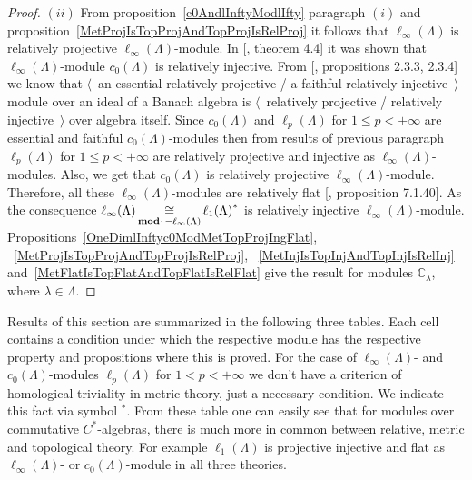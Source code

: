 \begin{proof}
$(ii)$ From proposition~\ref{c0AndlInftyModlIfty} paragraph $(i)$ and
proposition~\ref{MetProjIsTopProjAndTopProjIsRelProj} it follows that
$\ell_\infty(\Lambda)$ is relatively projective $\ell_\infty(\Lambda)$-module. 
In [\cite{NemANoteOnRelInjC0ModC0}, theorem 4.4] it was shown 
that $\ell_\infty(\Lambda)$-module $c_0(\Lambda)$ is relatively injective. 
From [\cite{RamsHomPropSemgroupAlg}, propositions 2.3.3, 2.3.4] we know that
$\langle$~an essential relatively projective / a  faithful relatively
injective~$\rangle$ module over an ideal of a Banach algebra is 
$\langle$~relatively projective / relatively injective~$\rangle$ over algebra 
itself. Since $c_0(\Lambda)$ and $\ell_p(\Lambda)$ for $1\leq p<+\infty$ are
essential and faithful $c_0(\Lambda)$-modules then from results of previous
paragraph $\ell_p(\Lambda)$ for $1\leq p<+\infty$ are relatively projective and
injective as $\ell_\infty(\Lambda)$-modules. Also, we get that $c_0(\Lambda)$ is
relatively projective $\ell_\infty(\Lambda)$-module. Therefore, all these
$\ell_\infty(\Lambda)$-modules are relatively flat [\cite{HelBanLocConvAlg},
proposition 7.1.40]. As the consequence $\ell_\infty(\Lambda)
\mathop{\mathbin{\cong}}\limits_{\mathbf{mod}_1-\ell_\infty(\Lambda)} {\ell_1(\Lambda)}^*$ is relatively
injective $\ell_\infty(\Lambda)$-module.
Propositions~\ref{OneDimlInftyc0ModMetTopProjIngFlat},
~\ref{MetProjIsTopProjAndTopProjIsRelProj},
~\ref{MetInjIsTopInjAndTopInjIsRelInj}
and~\ref{MetFlatIsTopFlatAndTopFlatIsRelFlat} give the result for modules
$\mathbb{C}_\lambda$, where $\lambda\in\Lambda$.
\end{proof}

Results of this section are summarized in the following three tables. Each cell
contains a condition under which the respective module has the respective
property and propositions where this is proved. For the case 
of $\ell_\infty(\Lambda)$- and $c_0(\Lambda)$-modules $\ell_p(\Lambda)$ 
for $1<p<+\infty$ we don't have a criterion of homological triviality in metric
theory, just a necessary condition. We indicate this fact via symbol ${}^*$.
From these table one can easily see that for modules over commutative
$C^*$-algebras, there is much more in common between relative, metric and
topological  theory. For example $\ell_1(\Lambda)$ is projective injective and
flat as $\ell_\infty(\Lambda)$- or $c_0(\Lambda)$-module in all three theories.



